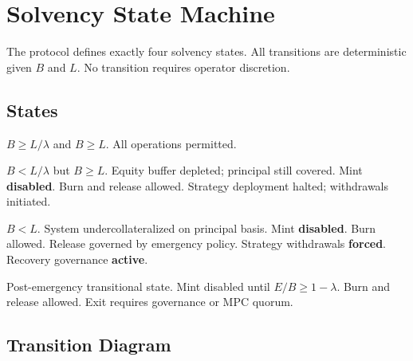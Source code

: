 \section{Solvency State Machine}

\label{sec:state-machine}

The protocol defines exactly four solvency states. All transitions are deterministic given $B$ and $L$. No transition requires operator discretion.

\subsection{States}

\begin{definition}[Healthy]
$B \geq L / \lambda$ and $B \geq L$. All operations permitted.
\end{definition}

\begin{definition}
$B < L / \lambda$ but $B \geq L$. Equity buffer depleted; principal still covered. Mint \textbf{disabled}. Burn and release allowed. Strategy deployment halted; withdrawals initiated.
\end{definition}

\begin{definition}[Emergency]
$B < L$. System undercollateralized on principal basis. Mint \textbf{disabled}. Burn allowed. Release governed by emergency policy. Strategy withdrawals \textbf{forced}. Recovery governance \textbf{active}.
\end{definition}

\begin{definition}[Recovery]
Post-emergency transitional state. Mint disabled until $E/B \geq 1 - \lambda$. Burn and release allowed. Exit requires governance or MPC quorum.
\end{definition}

\subsection{Transition Diagram}

\begin{center}
\end{center}

